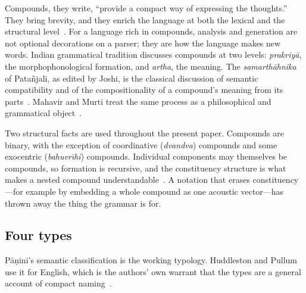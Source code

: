 \documentclass[manuscript, review, anonymous]{acmart}
\begin{document}
Compounds, they write, ``provide a compact way of expressing the thoughts.'' They bring brevity, and they enrich the language at both the lexical and the structural level~\cite{Satuluri2013Generation}. For a language rich in compounds, analysis and generation are not optional decorations on a parser; they are how the language makes new words. Indian grammatical tradition discusses compounds at two levels: \textit{prakriy{\=a}}, the morphophonological formation, and \textit{artha}, the meaning. The \textit{samarth{\=a}hnika} of Pata{\~n}jali, as edited by Joshi, is the classical discussion of semantic compatibility and of the compositionality of a compound's meaning from its parts~\cite{Joshi1968Samartha}. Mahavir and Murti treat the same process as a philosophical and grammatical object~\cite{Mahavir1986Samasa,Murti1974Compounds}.

Two structural facts are used throughout the present paper. Compounds are binary, with the exception of coordinative (\textit{dvandva}) compounds and some exocentric (\textit{bahuvr{\=\i}hi}) compounds. Individual components may themselves be compounds, so formation is recursive, and the constituency structure is what makes a nested compound understandable~\cite{Gillon2009Tagging,Satuluri2013Generation}. A notation that erases constituency---for example by embedding a whole compound as one acoustic vector---has thrown away the thing the grammar is for.

\subsection{Four types}

P{\=a}{\d{n}}ini's semantic classification is the working typology. Huddleston and Pullum use it for English, which is the authors' own warrant that the types are a general account of compact naming~\cite{Huddleston2002Cambridge,Satuluri2013Generation}.
\end{document}
